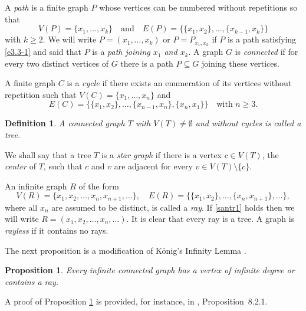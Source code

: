 \documentclass[pdflatex,sn-mathphys-num]{sn-jnl}%
\newtheorem{proposition}{Proposition}%
\newtheorem{definition}{Definition}%
\theoremstyle{thmstyletwo}%
\begin{document}
A \emph{path} is a finite graph \(P\) whose vertices can be numbered without repetitions so that
\begin{equation}\label{e3.3-1}
V(P) = \{x_1, \ldots, x_k\} \quad \text{and} \quad E(P) = \{\{x_1, x_2\}, \ldots, \{x_{k-1}, x_k\}\}
\end{equation}
with \(k \geqslant 2\). We will write \(P = (x_1, \ldots, x_k)\) or \(P = P_{x_1, x_k}\) if \(P\) is a path satisfying \eqref{e3.3-1} and said that \(P\) is a \emph{path joining \(x_1\) and \(x_k\)}. A graph \(G\) is \emph{connected} if for every two distinct vertices of \(G\) there is a path \(P \subseteq G\) joining these vertices.



A finite graph $C$ is a \textit{cycle} if there exists an enumeration of its vertices without repetition such that $V(C) = \{x_1, \ldots, x_n\}$ and
\begin{equation*}
E(C) = \{\{x_1, x_2\}, \ldots, \{x_{n-1}, x_n\}, \{x_n, x_1\}\} \quad \text{with } n \geq 3.
\end{equation*}

\begin{definition}
A connected graph $T$ with $V(T) \neq \emptyset$ and without cycles is called a \textit{tree}.
\end{definition}


We shall say that a tree \(T\) is a \emph{star graph} if there is a vertex \(c \in V(T)\), the \emph{center} of \(T\), such that \(c\) and \(v\) are adjacent for every \(v \in V(T) \setminus \{c\}\).


An infinite graph \(R\) of the form 
\begin{equation}
\label{santr1}
V(R) = \{x_1, x_2, \ldots, x_n, x_{n+1}, \ldots\}, \quad E(R) = \{\{x_1, x_2\}, \ldots, \{x_n, x_{n+1}\}, \ldots\},
\end{equation}
where all \(x_n\) are assumed to be distinct, is called a \emph{ray}. If \eqref{santr1} holds then we will write $R=(x_1,x_2,\ldots,x_n,\ldots)$. It is clear that every ray is a tree. A graph is \emph{rayless} if it contains no rays.


The next proposition is a modification of König's Infinity Lemma \cite{Konig}.


\begin{proposition}\label{p3.2}
Every infinite connected graph has a vertex of infinite degree or contains a ray.
\end{proposition}


A proof of Proposition \ref{p3.2} is provided, for instance, in \cite{Diestel2017}, Proposition~8.2.1.
\end{document}
